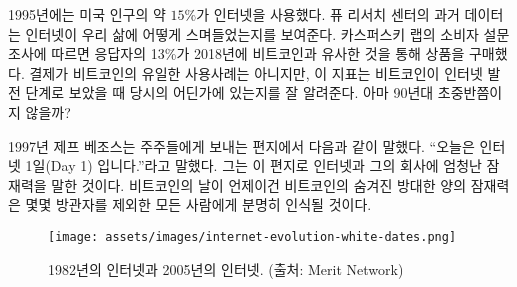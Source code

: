 \begin{comment}
	In 1995, about $15\%$ of American adults used the internet. Historical
	data from the Pew Research Center~\cite{pew-research} shows how the internet has woven
	itself into all our lives. According to a consumer survey by Kaspersky
	Lab~\cite{web:kaspersky}, 13\% of respondents have used Bitcoin and its clones to pay for
	goods in 2018. While payments aren't the only use-case of bitcoin, it is
	some indication of where we are in Internet time: in the early- to
	mid-90s.
\end{comment}
1995년에는 미국 인구의 약 $15\%$가 인터넷을 사용했다.
퓨 리서치 센터\cite{pew-research}의 과거 데이터는 인터넷이 우리 삶에 어떻게 스며들었는지를 보여준다.
카스퍼스키 랩\cite{web:kaspersky}의 소비자 설문 조사에 따르면 
응답자의 13\%가 2018년에 비트코인과 유사한 것을 통해 상품을 구매했다.
결제가 비트코인의 유일한 사용사례는 아니지만, 
이 지표는 비트코인이 인터넷 발전 단계로 보았을 때 당시의 어딘가에 있는지를 잘 알려준다.
아마 90년대 초중반쯤이지 않을까?

\begin{comment}
	In 1997, Jeff Bezos stated in a letter to shareholders~\cite{bezos-letter} that
	\enquote{this is Day 1 for the Internet,} recognizing the great untapped
	potential for the internet and, by extension, his company. Whatever day this is
	for Bitcoin, the vast amounts of untapped potential are clear to all but the
	most casual observer.
\end{comment}
1997년 제프 베조스는 주주들에게 보내는 편지\cite{bezos-letter}에서 다음과 같이 말했다.
\enquote{오늘은 인터넷 1일(Day 1) 입니다.}라고 말했다.
그는 이 편지로 인터넷과 그의 회사에 엄청난 잠재력을 말한 것이다.
비트코인의 날이 언제이건 비트코인의 숨겨진 방대한 양의 잠재력은 
몇몇 방관자를 제외한 모든 사람에게 분명히 인식될 것이다.


\begin{figure}
	\texttt{[image: assets/images/internet-evolution-white-dates.png]}
	\caption{1982년의 인터넷과 2005년의 인터넷. (출처: Merit Network)}
	\label{fig:internet-evolution-white-dates}
\end{figure}

